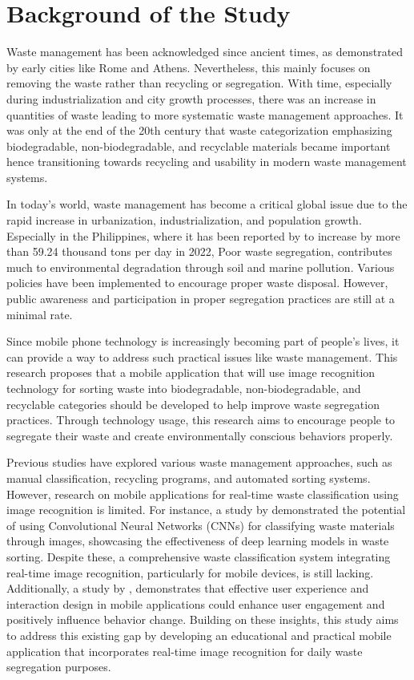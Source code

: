 \section{Background of the Study}

Waste management has been acknowledged since ancient times, as demonstrated by early cities like Rome and Athens. Nevertheless, this mainly focuses on removing the waste rather than recycling or segregation. With time, especially during industrialization and city growth processes, there was an increase in quantities of waste leading to more systematic waste management approaches. It was only at the end of the 20th century that waste categorization emphasizing biodegradable, non-biodegradable, and recyclable materials became important hence transitioning towards recycling and usability in modern waste management systems.

In today's world, waste management has become a critical global issue due to the rapid increase in urbanization, industrialization, and population growth. Especially in the Philippines, where it has been reported by \textcite{statista2022waste} to increase by more than 59.24 thousand tons per day in 2022, Poor waste segregation, contributes much to environmental degradation through soil and marine pollution. Various policies have been implemented to encourage proper waste disposal. However, public awareness and participation in proper segregation practices are still at a minimal rate.

Since mobile phone technology is increasingly becoming part of people's lives, it can provide a way to address such practical issues like waste management. This research proposes that a mobile application that will use image recognition technology for sorting waste into biodegradable, non-biodegradable, and recyclable categories should be developed to help improve waste segregation practices. Through technology usage, this research aims to encourage people to segregate their waste and create environmentally conscious behaviors properly.

Previous studies have explored various waste management approaches, such as manual classification, recycling programs, and automated sorting systems. However, research on mobile applications for real-time waste classification using image recognition is limited. For instance, a study by \textcite{Malik2022} demonstrated the potential of using Convolutional Neural Networks (CNNs) for classifying waste materials through images, showcasing the effectiveness of deep learning models in waste sorting. Despite these, a comprehensive waste classification system integrating real-time image recognition, particularly for mobile devices, is still lacking. Additionally, a study by \textcite{AhmadFaudzi2023}, demonstrates that effective user experience and interaction design in mobile applications could enhance user engagement and positively influence behavior change. Building on these insights, this study aims to address this existing gap by developing an educational and practical mobile application that incorporates real-time image recognition for daily waste segregation purposes.

